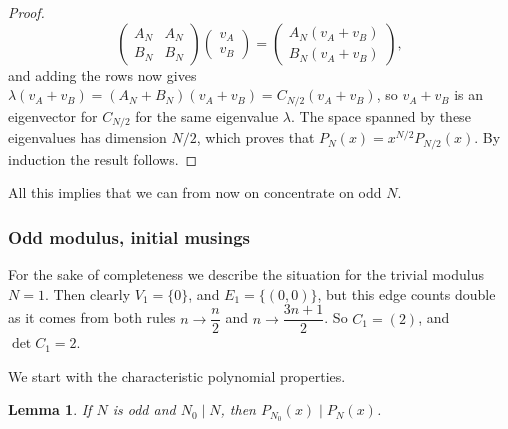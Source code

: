 \documentclass[10pt]{article}
\newtheorem{lemma}{Lemma}
\theoremstyle{definition}
\begin{document}
\begin{proof}
\[    \begin{pmatrix} A_N & A_N \\ B_N & B_N \end{pmatrix} \begin{pmatrix} v_A \\ v_B \end{pmatrix} =
    \begin{pmatrix} A_N (v_A + v_B) \\ B_N (v_A + v_B) \end{pmatrix}, \]
    and adding the rows now gives $ \lambda (v_A + v_B) = (A_N + B_N) (v_A + v_B) = C_{N/2} (v_A + v_B) $, so
    $ v_A + v_B $ is an eigenvector for $ C_{N/2} $ for the same eigenvalue $ \lambda $. The space spanned
    by these eigenvalues has dimension $ N/2 $, which proves that $ P_N(x) = x^{N/2} P_{N/2}(x) $.
    By induction the result follows.
\end{proof}

All this implies that we can from now on concentrate on odd $ N $.

\subsubsection{Odd modulus, initial musings}

For the sake of completeness we describe the situation for the trivial modulus $ N = 1 $. Then
clearly $ V_1 = \{ 0 \} $, and $ E_1 = \{ (0,0) \} $, but this edge counts double as it comes from
both rules $ n \to \dfrac{n}{2} $ and $ n \to \dfrac{3n+1}{2} $. So $ C_1 = (2) $, and
$ \det C_1 = 2 $.

We start with the characteristic polynomial properties.

\begin{lemma} \label{lem:oddcharpol}
    If $ N $ is odd and $ N_0 \mid N $, then $ P_{N_0}(x) \mid P_N(x) $.
\end{lemma}
\end{document}
